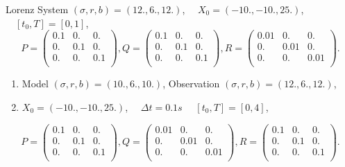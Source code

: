 \begin{frame}[allowframebreaks]{Lorenz System}
    $(\sigma, r, b)=(12.,6.,12.)$, $\quad X_0=(-10.,-10.,25.)$, $\quad [t_0,T]=[0,1]$,
	$$P=\begin{pmatrix}
    0.1 & 0. & 0. \\
    0. & 0.1 & 0. \\
    0. & 0. & 0.1 \\
    \end{pmatrix} ,
    Q=\begin{pmatrix}
    0.1 & 0. & 0. \\
    0. & 0.1 & 0. \\
    0. & 0. & 0.1 \\
    \end{pmatrix},
    R=\begin{pmatrix}
    0.01 & 0. & 0. \\
    0. & 0.01 & 0. \\
    0. & 0. & 0.01 \\
    \end{pmatrix}.$$ 
	
	\newpage
	
    \begin{enumerate}[\textbullet]
		\item Model $(\sigma, r, b)=(10.,6.,10.)$, Observation $(\sigma, r, b)=(12.,6.,12.)$,
	    \item $X_0=(-10.,-10.,25.)$, $\quad \Delta t=0.1s$ $\quad [t_0,T]=[0,4]$,
	    \end{enumerate}
    	$$P=\begin{pmatrix}
        0.1 & 0. & 0. \\
         0. & 0.1 & 0. \\
        0. & 0. & 0.1 \\
        \end{pmatrix} ,
        Q=\begin{pmatrix}
         0.01 & 0. & 0. \\
        0. & 0.01 & 0. \\
        0. & 0. & 0.01 \\
        \end{pmatrix},
        R=\begin{pmatrix}
        0.1 & 0. & 0. \\
        0. & 0.1 & 0. \\
        0. & 0. & 0.1 \\
        \end{pmatrix}.$$


\end{frame}

